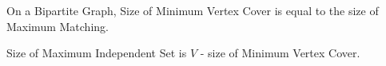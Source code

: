 On a Bipartite Graph, Size of Minimum Vertex Cover is equal to the size of Maximum Matching.

Size of Maximum Independent Set is $V$ - size of Minimum Vertex Cover.